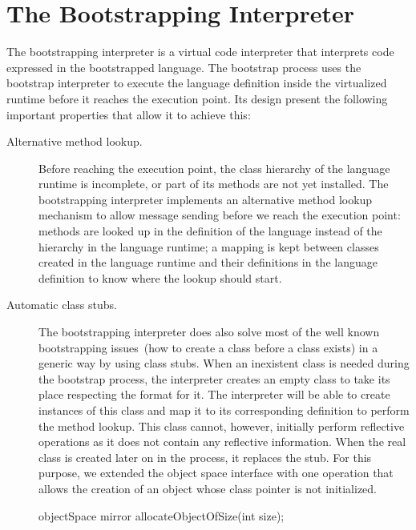 \section{The Bootstrapping Interpreter}\label{sec:ast_interpreter}

The bootstrapping interpreter is a virtual code interpreter that interprets code expressed in the bootstrapped language. The bootstrap process uses the bootstrap interpreter to execute the language definition inside the virtualized runtime before it reaches the execution point. Its design present the following important properties that allow it to achieve this:

\begin{description}
\item[Alternative method lookup.] Before reaching the execution point, the class hierarchy of the language runtime is incomplete, or part of its methods are not yet installed. The bootstrapping interpreter implements an alternative method lookup mechanism to allow message sending before we reach the execution point: methods are looked up in the definition of the language instead of the hierarchy in the language runtime; a mapping is kept between classes created in the language runtime and their definitions in the language definition to know where the lookup should start.

\item[Automatic class stubs.] The bootstrapping interpreter does also solve most of the well known bootstrapping issues~(\eg how to create a class before a class exists) in a generic way by using class stubs. When an inexistent class is needed during the bootstrap process, the interpreter creates an empty class to take its place respecting the \VM format for it. The interpreter will be able to create instances of this class and map it to its corresponding definition to perform the method lookup. This class cannot, however, initially perform reflective operations as it does not contain any reflective information. When the real class is created later on in the process, it replaces the stub. For this purpose, we extended the object space interface with one operation that allows the creation of an object whose class pointer is not initialized.

\begin{code}
objectSpace {
    mirror allocateObjectOfSize(int size);
}
\end{code}

\end{description}

